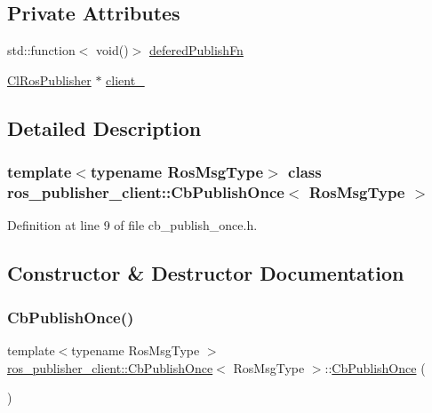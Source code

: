 \subsection*{Private Attributes}
\begin{DoxyCompactItemize}
\item 
std\+::function$<$ void()$>$ \hyperlink{classros__publisher__client_1_1CbPublishOnce_a91e0e3d574d25e160bcb3a4ca81bb0b2}{defered\+Publish\+Fn}
\item 
\hyperlink{classros__publisher__client_1_1ClRosPublisher}{Cl\+Ros\+Publisher} $\ast$ \hyperlink{classros__publisher__client_1_1CbPublishOnce_a50a1b2a4892ad780406231e0f870746a}{client\+\_\+}
\end{DoxyCompactItemize}


\subsection{Detailed Description}
\subsubsection*{template$<$typename Ros\+Msg\+Type$>$\newline
class ros\+\_\+publisher\+\_\+client\+::\+Cb\+Publish\+Once$<$ Ros\+Msg\+Type $>$}



Definition at line 9 of file cb\+\_\+publish\+\_\+once.\+h.



\subsection{Constructor \& Destructor Documentation}
\mbox{\label{classros__publisher__client_1_1CbPublishOnce_a7e58cbae17032aef05161697b7a061c5}} 
\subsubsection{\texorpdfstring{Cb\+Publish\+Once()}{CbPublishOnce()}\hspace{0.1cm}{\footnotesize\ttfamily [1/2]}}
{\footnotesize\ttfamily template$<$typename Ros\+Msg\+Type $>$ \\
\hyperlink{classros__publisher__client_1_1CbPublishOnce}{ros\+\_\+publisher\+\_\+client\+::\+Cb\+Publish\+Once}$<$ Ros\+Msg\+Type $>$\+::\hyperlink{classros__publisher__client_1_1CbPublishOnce}{Cb\+Publish\+Once} (\begin{DoxyParamCaption}{ }\end{DoxyParamCaption})\hspace{0.3cm}{\ttfamily [inline]}}



